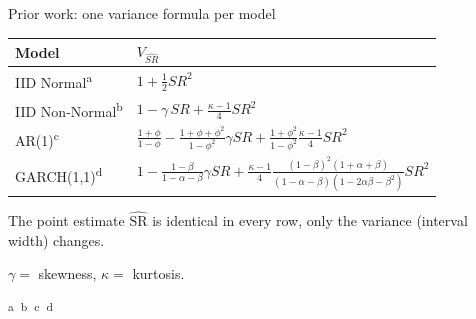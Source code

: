 \documentclass[aspectratio=169,10pt]{beamer}
\begin{document}
\begin{frame}{Prior work: one variance formula per model}
  \centering
  \footnotesize
  \begin{tabular}{@{}ll@{}}
    \toprule
    Model & $V_{\widehat{SR}}$ \\
    \midrule
    IID Normal\textsuperscript{a}       & $1 + \frac{1}{2}SR^2$ \\[4pt]
    IID Non-Normal\textsuperscript{b}   & $1 - \gamma\,SR + \tfrac{\kappa-1}{4}SR^2$ \\[4pt]
    AR(1)\textsuperscript{c}            & $\frac{1+\phi}{1-\phi} - \frac{1 + \phi +\phi^2}{1 - \phi^2}\gamma SR + \frac{1+\phi^2}{1-\phi^2} \frac{\kappa - 1}{4}SR^2$ \\[8pt]
    GARCH(1,1)\textsuperscript{d}       & $1 - \frac{1-\beta}{1-\alpha-\beta}\gamma SR + \frac{\kappa-1}{4}\frac{(1-\beta)^2 (1+\alpha+\beta)}{(1-\alpha-\beta)(1-2\alpha\beta-\beta^2)}SR^2$ \\
    \bottomrule
  \end{tabular}

  \normalsize
  \vspace{0.7em}
  \alert{The point estimate $\widehat{\mathrm{SR}}$ is identical in every row,}
   only the variance (interval width) changes.

  \vfill
  {\scriptsize $\gamma=$ skewness, \quad $\kappa=$ kurtosis.}

  \vspace{0.3em}
  {\scriptsize\raggedright
   \textsuperscript{a}\,\parencite{Lo2002}\quad
   \textsuperscript{b}\,\parencite{Mertens2002}\quad
   \textsuperscript{c}\,\parencite{Lopez2025}\quad
   \textsuperscript{d}\,\parencite{Lopez2026}\par}
\end{frame}
\end{document}
